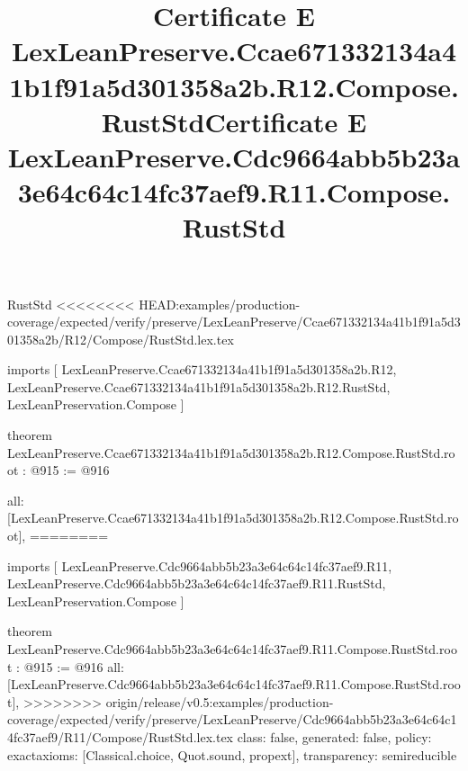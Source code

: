\begin{lexlean}{RustStd}
<<<<<<<< HEAD:examples/production-coverage/expected/verify/preserve/LexLeanPreserve/Ccae671332134a41b1f91a5d301358a2b/R12/Compose/RustStd.lex.tex
\title{Certificate E LexLeanPreserve.Ccae671332134a41b1f91a5d301358a2b.R12.Compose.RustStd}
\begin{coremodule}
imports [
  LexLeanPreserve.Ccae671332134a41b1f91a5d301358a2b.R12,
  LexLeanPreserve.Ccae671332134a41b1f91a5d301358a2b.R12.RustStd,
  LexLeanPreservation.Compose
]

theorem LexLeanPreserve.Ccae671332134a41b1f91a5d301358a2b.R12.Compose.RustStd.root : @915 := @916 {
  all: [LexLeanPreserve.Ccae671332134a41b1f91a5d301358a2b.R12.Compose.RustStd.root],
========
\title{Certificate E LexLeanPreserve.Cdc9664abb5b23a3e64c64c14fc37aef9.R11.Compose.RustStd}
\begin{coremodule}
imports [
  LexLeanPreserve.Cdc9664abb5b23a3e64c64c14fc37aef9.R11,
  LexLeanPreserve.Cdc9664abb5b23a3e64c64c14fc37aef9.R11.RustStd,
  LexLeanPreservation.Compose
]

theorem LexLeanPreserve.Cdc9664abb5b23a3e64c64c14fc37aef9.R11.Compose.RustStd.root : @915 := @916 {
  all: [LexLeanPreserve.Cdc9664abb5b23a3e64c64c14fc37aef9.R11.Compose.RustStd.root],
>>>>>>>> origin/release/v0.5:examples/production-coverage/expected/verify/preserve/LexLeanPreserve/Cdc9664abb5b23a3e64c64c14fc37aef9/R11/Compose/RustStd.lex.tex
  class: false,
  generated: false,
  policy: exact{axioms: [Classical.choice, Quot.sound, propext]},
  transparency: semireducible
}


\end{coremodule}}
\end{coremodule}
\end{lexlean}
